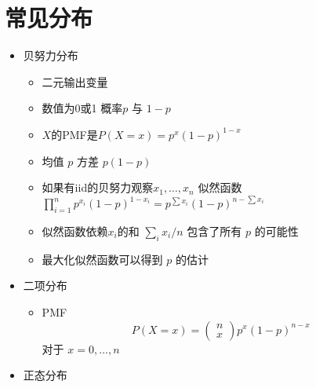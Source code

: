 \documentclass[]{book}
\providecommand{\tightlist}{%
  \setlength{\itemsep}{0pt}\setlength{\parskip}{0pt}}
\begin{document}
\hypertarget{ux5e38ux89c1ux5206ux5e03}{%
\section{常见分布}\label{ux5e38ux89c1ux5206ux5e03}}

\begin{itemize}
\tightlist
\item
  贝努力分布

  \begin{itemize}
  \tightlist
  \item
    二元输出变量
  \item
    数值为0或1 概率\(p\) 与 \(1-p\)
  \item
    \(X\)的PMF是\(P(X = x) = p^x (1 - p)^{1 - x}\)
  \item
    均值 \(p\) 方差 \(p(1 - p)\)
  \item
    如果有iid的贝努力观察\(x_1,\ldots, x_n\) 似然函数 \(\prod_{i=1}^n p^{x_i} (1 - p)^{1 - x_i} = p^{\sum x_i} (1 - p)^{n - \sum x_i}\)
  \item
    似然函数依赖\(x_i\)的和 \(\sum_i x_i / n\) 包含了所有 \(p\) 的可能性
  \item
    最大化似然函数可以得到 \(p\) 的估计
  \end{itemize}
\item
  二项分布

  \begin{itemize}
  \tightlist
  \item
    PMF
    \[
    P(X = x) = 
    \left(
    \begin{array}{c}
    n \\ x
    \end{array}
    \right)
    p^x(1 - p)^{n-x}
    \]
    对于 \(x=0,\ldots,n\)
  \end{itemize}
\item
  正态分布


\end{itemize}
\end{document}
